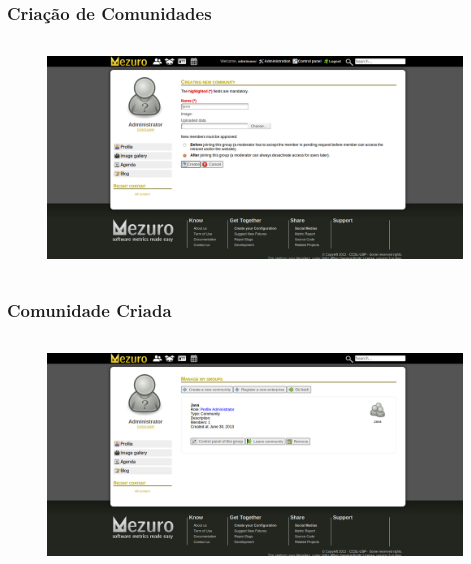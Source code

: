 \documentclass{beamer}
\begin{document}
    \begin{frame}
      \frametitle{Criação de Comunidades}
      \framesubtitle{}
    
      \begin{figure}
        \begin{center}
          \includegraphics[width=11cm, height=6cm]{images/02-community-creation.png}
          \label{fig:}
        \end{center}
      \end{figure}
    \end{frame}
    
    \begin{frame}
      \frametitle{Comunidade Criada}
      \framesubtitle{}
    
      \begin{figure}
        \begin{center}
          \includegraphics[width=11cm, height=6cm]{images/03-community-created.png}
          \label{fig:}
        \end{center}
      \end{figure}
    \end{frame}
    
\end{document}

